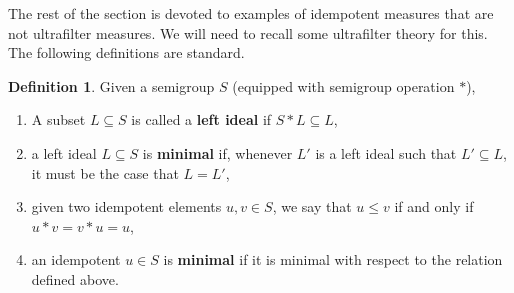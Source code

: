 \documentclass{jloganal}
\theoremstyle{definition}
\newtheorem{defn}[thm]{Definition}    %
\begin{document}


The rest of the section is devoted to examples of idempotent measures that are not ultrafilter measures. We will need to recall some ultrafilter theory for this. The following definitions are standard.

\begin{defn}
Given a semigroup $S$ (equipped with semigroup operation $*$),
\begin{enumerate}
    \item A subset $L\subseteq S$ is called a {\bf left ideal} if $ S*L\subseteq L$,
    \item a left ideal $L\subseteq S$ is {\bf minimal} if, whenever $L'$ is a left ideal such that $L'\subseteq L$, it must be the case that $L=L'$,
    \item given two idempotent elements $u,v\in S$, we say that $u\leq v$ if and only if $u*v=v*u=u$,
    \item an idempotent $u\in S$ is {\bf minimal} if it is minimal with respect to the relation defined above.
\end{enumerate}
\end{defn}
\end{document}
